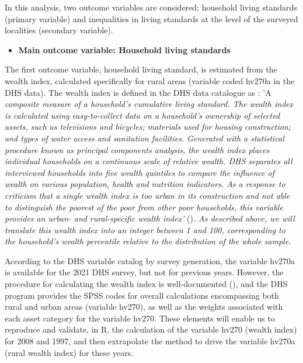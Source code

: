 \documentclass[
]{article}
\providecommand{\tightlist}{%
  \setlength{\itemsep}{0pt}\setlength{\parskip}{0pt}}\usepackage{longtable,booktabs,array}
\begin{document}
In this analysis, two outcome variables are considered: household living
standards (primary variable) and inequalities in living standards at the
level of the surveyed localities (secondary variable).

\begin{itemize}
\tightlist
\item
  \textbf{Main outcome variable: Household living standards}
\end{itemize}

The first outcome variable, household living standard, is estimated from
the wealth index, calculated specifically for rural areas (variable
coded hv270a in the DHS data). The wealth index is defined in the DHS
data catalogue as : 'A \emph{composite measure of a household's
cumulative living standard. The wealth index is calculated using
easy-to-collect data on a household's ownership of selected assets, such
as televisions and bicycles; materials used for housing construction;
and types of water access and sanitation facilities. Generated with a
statistical procedure known as principal components analysis, the wealth
index places individual households on a continuous scale of relative
wealth. DHS separates all interviewed households into five wealth
quintiles to compare the influence of wealth on various population,
health and nutrition indicators. As a response to criticism that a
single wealth index is too urban in its construction and not able to
distinguish the poorest of the poor from other poor households, this
variable provides an urban- and rural-specific wealth index'}
()\emph{.} \emph{As described above, we will translate this wealth
index into an integer between 1 and 100, corresponding to the
household's wealth percentile relative to the distribution of the whole
sample.}

According to the DHS variable catalog by survey generation, the variable
hv270a is available for the 2021 DHS survey, but not for previous years.
However, the procedure for calculating the wealth index is
well-documented (), and the DHS program provides the SPSS codes for overall
calculations encompassing both rural and urban areas (variable hv270),
as well as the weights associated with each asset category for the
variable hv270\footnotemark[10]. These elements will enable us to
reproduce and validate, in R, the calculation of the variable hv270
(wealth index) for 2008 and 1997, and then extrapolate the method to
drive the variable hv270a (rural wealth index) for these years.
\end{document}

